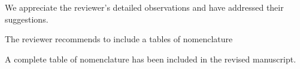 \documentclass[11pt,answers]{exam}
\begin{document}
\begin{questions}
    \begin{solutionorbox} \label{comment:3_5}
        We appreciate the reviewer’s detailed observations and have addressed their suggestions.
    \end{solutionorbox}


    \question The reviewer recommends to include a tables of nomenclature

    \begin{solutionorbox} \label{comment:3_6}
        A complete table of nomenclature has been included in the revised manuscript.
    \end{solutionorbox}
\end{questions}


\newpage


\end{document}
